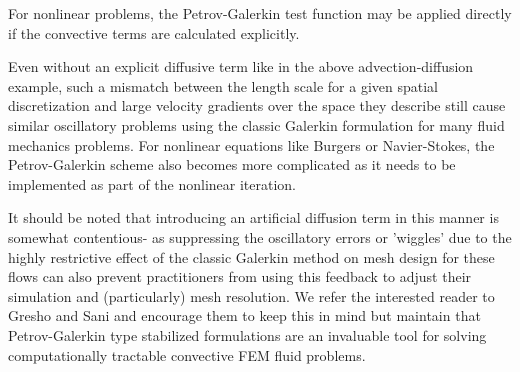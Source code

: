 
For nonlinear problems, the Petrov-Galerkin test function may be applied directly if the convective terms are calculated explicitly. 

Even without an explicit diffusive term like in the above advection-diffusion example, such a mismatch between the length scale for a given spatial discretization and large velocity gradients over the space they describe still cause similar oscillatory problems using the classic Galerkin formulation for many fluid mechanics problems. For nonlinear equations like Burgers or Navier-Stokes, the Petrov-Galerkin scheme also becomes more complicated as it needs to be implemented as part of the nonlinear iteration. 

It should be noted that introducing an artificial diffusion term in this manner is somewhat contentious- as suppressing the oscillatory errors or 'wiggles' due to the highly restrictive effect of the classic Galerkin method on mesh design for these flows can also prevent practitioners from using this feedback to adjust their simulation and (particularly) mesh resolution. We refer the interested reader to Gresho and Sani and encourage them to keep this in mind but maintain that Petrov-Galerkin type stabilized formulations are an invaluable tool for solving computationally tractable convective FEM fluid problems.


